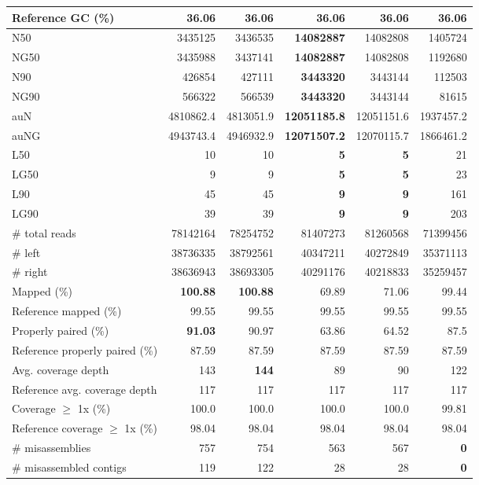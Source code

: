 \documentclass[12pt,a4paper]{article}
\begin{document}
\begin{table}[ht]
\begin{center}
\begin{tabular}{|l*{5}{|r}|}
Reference GC (\%) & 36.06 & 36.06 & 36.06 & 36.06 & 36.06 \\ \hline
N50 & 3435125 & 3436535 & {\bf 14082887} & 14082808 & 1405724 \\ \hline
NG50 & 3435988 & 3437141 & {\bf 14082887} & 14082808 & 1192680 \\ \hline
N90 & 426854 & 427111 & {\bf 3443320} & 3443144 & 112503 \\ \hline
NG90 & 566322 & 566539 & {\bf 3443320} & 3443144 & 81615 \\ \hline
auN & 4810862.4 & 4813051.9 & {\bf 12051185.8} & 12051151.6 & 1937457.2 \\ \hline
auNG & 4943743.4 & 4946932.9 & {\bf 12071507.2} & 12070115.7 & 1866461.2 \\ \hline
L50 & 10 & 10 & {\bf 5} & {\bf 5} & 21 \\ \hline
LG50 & 9 & 9 & {\bf 5} & {\bf 5} & 23 \\ \hline
L90 & 45 & 45 & {\bf 9} & {\bf 9} & 161 \\ \hline
LG90 & 39 & 39 & {\bf 9} & {\bf 9} & 203 \\ \hline
\# total reads & 78142164 & 78254752 & 81407273 & 81260568 & 71399456 \\ \hline
\# left & 38736335 & 38792561 & 40347211 & 40272849 & 35371113 \\ \hline
\# right & 38636943 & 38693305 & 40291176 & 40218833 & 35259457 \\ \hline
Mapped (\%) & {\bf 100.88} & {\bf 100.88} & 69.89 & 71.06 & 99.44 \\ \hline
Reference mapped (\%) & 99.55 & 99.55 & 99.55 & 99.55 & 99.55 \\ \hline
Properly paired (\%) & {\bf 91.03} & 90.97 & 63.86 & 64.52 & 87.5 \\ \hline
Reference properly paired (\%) & 87.59 & 87.59 & 87.59 & 87.59 & 87.59 \\ \hline
Avg. coverage depth & 143 & {\bf 144} & 89 & 90 & 122 \\ \hline
Reference avg. coverage depth & 117 & 117 & 117 & 117 & 117 \\ \hline
Coverage $\geq$ 1x (\%) & 100.0 & 100.0 & 100.0 & 100.0 & 99.81 \\ \hline
Reference coverage $\geq$ 1x (\%) & 98.04 & 98.04 & 98.04 & 98.04 & 98.04 \\ \hline
\# misassemblies & 757 & 754 & 563 & 567 & {\bf 0} \\ \hline
\# misassembled contigs & 119 & 122 & 28 & 28 & {\bf 0} \\ \hline

\end{tabular}
\end{center}
\end{table}
\end{document}
